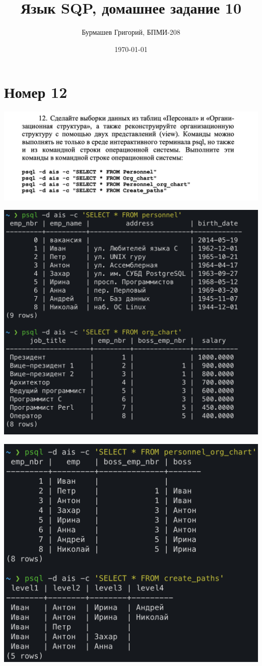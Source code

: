 \documentclass[a4paper,12pt]{article}
\author{Бурмашев Григорий, БПМИ-208}
\title{Язык SQP, домашнее задание 10}
\date{\today}
\begin{document}
\maketitle
\clearpage
\section*{Номер 12} 
\includegraphics[scale=0.5]{12_1.png}
\clearpage
\begin{center}
\includegraphics[scale=0.7]{12_2.png}
\end{center}
\begin{center}
\includegraphics[scale=0.7]{12_3.png}
\end{center}
\clearpage
\end{document}
